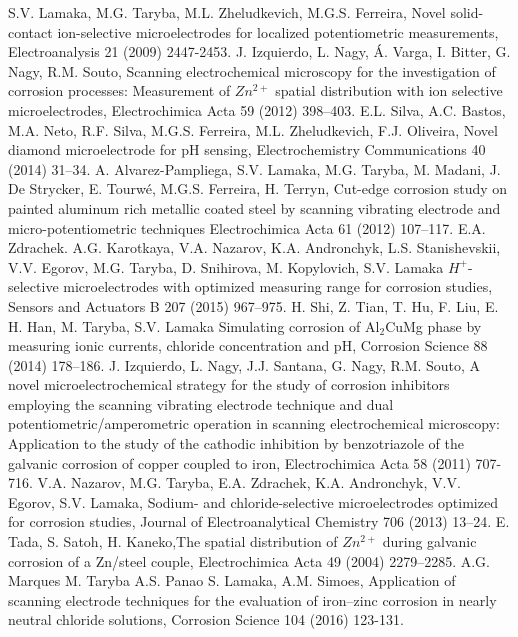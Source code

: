 \documentclass[3p]{elsarticle}
\begin{document}
\begin{thebibliography}{5}

S.V. Lamaka, M.G. Taryba, M.L. Zheludkevich, M.G.S. Ferreira, Novel solid-contact ion-selective microelectrodes for localized potentiometric measurements, Electroanalysis 21 (2009) 2447-2453.
J. Izquierdo, L. Nagy, Á. Varga, I. Bitter, G. Nagy, R.M. Souto, Scanning electrochemical microscopy for the investigation of corrosion processes: Measurement of  $Zn^{2+}$ spatial distribution with ion selective microelectrodes, Electrochimica Acta 59 (2012) 398–403. 
E.L. Silva, A.C. Bastos, M.A. Neto, R.F. Silva, M.G.S. Ferreira, M.L. Zheludkevich, F.J. Oliveira, Novel diamond microelectrode for pH sensing, Electrochemistry Communications 40 (2014) 31–34.
A. Alvarez-Pampliega, S.V. Lamaka, M.G. Taryba, M. Madani, J. De Strycker, E. Tourwé, M.G.S. Ferreira, H. Terryn, Cut-edge corrosion study on painted aluminum rich metallic coated steel by scanning vibrating electrode and micro-potentiometric techniques Electrochimica Acta 61 (2012) 107–117.	
E.A. Zdrachek. A.G. Karotkaya, V.A. Nazarov, K.A. Andronchyk, L.S. Stanishevskii, V.V. Egorov, M.G. Taryba, D. Snihirova, M. Kopylovich, S.V. Lamaka $H^{+}$-selective microelectrodes with optimized measuring range for corrosion studies, Sensors and Actuators B 207 (2015) 967–975.
H. Shi, Z. Tian, T. Hu, F. Liu, E. H. Han, M. Taryba, S.V. Lamaka Simulating corrosion of Al$_{2}$CuMg phase by measuring ionic currents, chloride concentration and pH, Corrosion Science 88 (2014) 178–186.
J. Izquierdo, L. Nagy, J.J. Santana, G. Nagy, R.M. Souto, A novel microelectrochemical strategy for the study of corrosion inhibitors employing the scanning vibrating electrode technique and dual potentiometric/amperometric operation in scanning electrochemical microscopy: Application to the study of the cathodic inhibition by benzotriazole of the galvanic corrosion of copper coupled to iron, Electrochimica Acta 58 (2011) 707-716.
V.A. Nazarov, M.G. Taryba, E.A. Zdrachek, K.A. Andronchyk, V.V. Egorov, S.V. Lamaka, Sodium- and chloride-selective microelectrodes optimized for corrosion studies, Journal of Electroanalytical Chemistry 706 (2013) 13–24.
E. Tada, S. Satoh, H. Kaneko,The spatial distribution of $Zn^{2+}$ during galvanic corrosion of a Zn/steel couple, Electrochimica Acta 49 (2004) 2279–2285.
A.G. Marques M. Taryba A.S. Panao S. Lamaka, A.M. Simoes, Application of scanning electrode techniques for the evaluation of iron–zinc corrosion in nearly neutral chloride solutions, Corrosion Science 104 (2016) 123-131.

\end{thebibliography}
\end{document}
